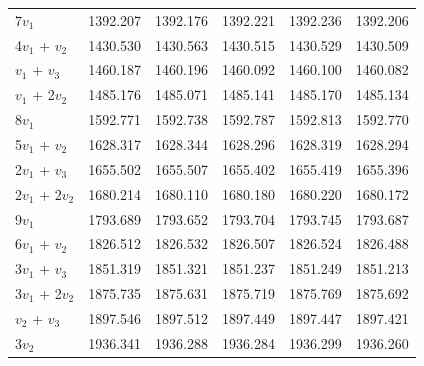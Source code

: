 \begin{table}
\begin{small}
\begin{tabular}{|l | r | r | r | r | r| }
 7$v_1$            &   1392.207    &   1392.176    &    1392.221    &  1392.236 &1392.206\\                   
 4$v_1$ + $v_2$  &   1430.530    &   1430.563    &    1430.515    &  1430.529 &1430.509\\                   
 $v_1$ + $v_3$   &   1460.187    &   1460.196    &    1460.092    &  1460.100 &1460.082\\                   
 $v_1$ + 2$v_2$  &   1485.176    &   1485.071    &    1485.141    &  1485.170 &1485.134\\                   
 8$v_1$            &   1592.771    &   1592.738    &    1592.787    &  1592.813 &1592.770\\                   
 5$v_1$ + $v_2$  &   1628.317    &   1628.344    &    1628.296    &  1628.319 &1628.294\\                   
 2$v_1$ + $v_3$  &   1655.502    &   1655.507    &    1655.402    &  1655.419 &1655.396\\                   
 2$v_1$ + 2$v_2$ &   1680.214    &   1680.110    &    1680.180    &  1680.220 &1680.172\\                   
 9$v_1$            &   1793.689    &   1793.652    &    1793.704    &  1793.745 &1793.687\\                   
 6$v_1$ + $v_2$  &   1826.512    &   1826.532    &    1826.507    &  1826.524 &1826.488\\                   
 3$v_1$ + $v_3$  &   1851.319    &   1851.321    &    1851.237    &  1851.249 &1851.213\\                   
 3$v_1$ + 2$v_2$ &   1875.735    &   1875.631    &    1875.719    &  1875.769 &1875.692\\                   
 $v_2$ + $v_3$   &   1897.546    &   1897.512    &    1897.449    &  1897.447 &1897.421\\                   
 3$v_2$            &   1936.341    &   1936.288    &    1936.284    &  1936.299 &1936.260\\                   
    \hline                
\end{tabular} 
\end{small}
\end{table}







